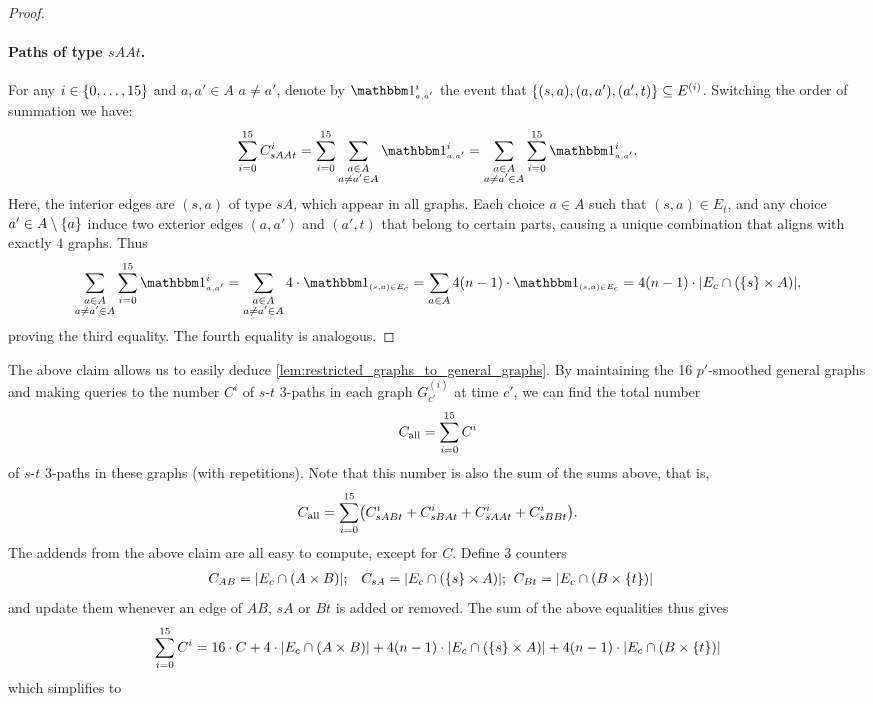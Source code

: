 \documentclass[letter,11pt]{article}
\newcommand{\paths}[3]{${#1}$-${#2}$ ${#3}$-paths\xspace}
\begin{document}
\begin{proof}
    \paragraph{Paths of type $sAAt$.} For any $i\in\{0,\dots,15\}$ and $a,a'\in A$ $a\neq a'$, denote by $\ind{a,a'}^i$ the event that $\{(s,a), (a,a'), (a',t)\} \subseteq E^{(i)}$. 
    Switching the order of summation we have:
    \[
\begin{aligned}
        \sum_{i=0}^{15} C^i_{sAAt}
        = \sum_{i=0}^{15} \sum_{\substack{a\in A\\a\neq a'\in A}} \ind{a,a'}^i
        = \sum_{\substack{a\in A\\a\neq a'\in A}} \sum_{i=0}^{15} \ind{a,a'}^i .
    \end{aligned}
\]
    Here, the interior edges are $(s,a)$ of type $sA$, which appear in all graphs. 
    Each choice $a\in A$ such that $(s,a)\in E_t$, and any choice $a'\in A\setminus\{a\}$ induce two exterior edges $(a,a')$ and $(a',t)$ that belong to certain parts, causing a unique combination that aligns with exactly $4$ graphs. Thus
    \[
\begin{aligned}
		\sum_{\substack{a\in A\\a\neq a'\in A}} \sum_{i=0}^{15} \ind{a,a'}^i
        = 
        \sum_{\substack{a\in A\\a\neq a'\in A}} 4\cdot \ind{(s,a)\in E_c}        
        = \sum_{a\in A} 4(n-1)\cdot \ind{(s,a)\in E_c} 
        = 4(n-1)\cdot \card{E_c \cap \left(\set{s} \times A\right)} ,
    \end{aligned}
\]
    proving the third equality. The fourth equality is analogous.
\end{proof}

The above claim allows us to easily deduce \cref{lem:restricted_graphs_to_general_graphs}.
By maintaining the 16 $p'$-smoothed general graphs and making queries to the number $C^i$ of \paths st3 in each graph $G_{c'}^{(i)}$ at time $c'$, we can find the total number 
\[
C_\textnormal{all}=\sum_{i=0}^{15} C^i
\]
of \paths st3 in these graphs (with repetitions).
Note that this number is also the sum of the sums above, that is,
\[
C_\textnormal{all} = \sum_{i=0}^{15} 
\left( 
  C^i_{sABt} 
+ C^i_{sBAt} 
+ C^i_{sAAt}
+ C^i_{sBBt} \right).
\]
The addends from the above claim are all easy to compute, except for $C$.
Define 3 counters
\[
\begin{aligned}
	& C_{AB}= 
	\card{E_c \cap \left(A \times B\right)};
	& C_{sA}= 
	\card{E_c \cap \left(\set{s} \times A\right)};\;\;
	& C_{Bt}=
	\card{E_c \cap \left(B \times \set{t}\right)}
\end{aligned}
\]
and update them whenever an edge of $AB$, $sA$ or $Bt$ is added or removed.
The sum of the above equalities thus gives
\[
    \sum_{i=0}^{15} C^i
    =
    16 \cdot C 
    + 
    4\cdot \card{E_c \cap \left(A \times B\right)}
    +
    4(n-1)\cdot \card{E_c \cap \left(\set{s} \times A\right)}
    +
    4(n-1)\cdot \card{E_c \cap \left(B \times \set{t}\right)}
\]
which simplifies to
\end{document}
